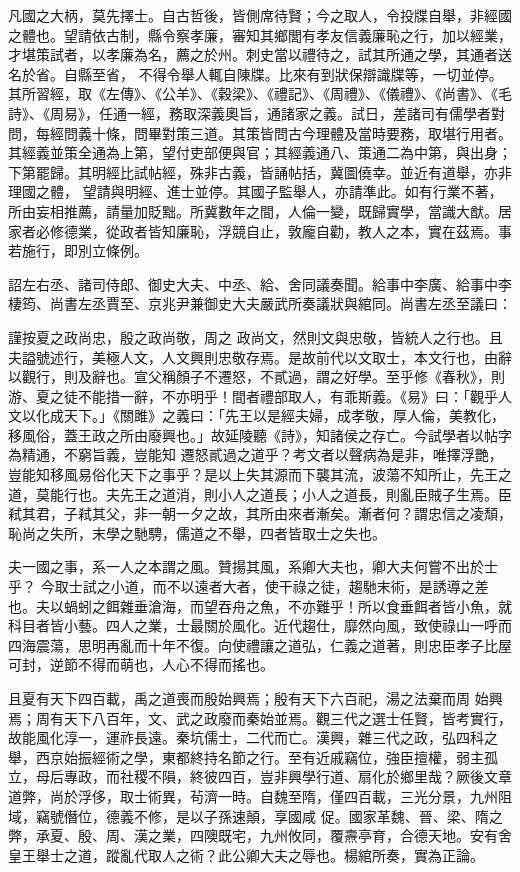 \begin{pinyinscope}
 凡國之大柄，莫先擇士。自古哲後，皆側席待賢；今之取人，令投牒自舉，非經國之體也。望請依古制，縣令察孝廉，審知其鄉閭有孝友信義廉恥之行，加以經業，才堪策試者，以孝廉為名，薦之於州。刺史當以禮待之，試其所通之學，其通者送名於省。自縣至省，
 不得令舉人輒自陳牒。比來有到狀保辯識牒等，一切並停。其所習經，取《左傳》、《公羊》、《穀梁》、《禮記》、《周禮》、《儀禮》、《尚書》、《毛詩》、《周易》，任通一經，務取深義奧旨，通諸家之義。試日，差諸司有儒學者對問，每經問義十條，問畢對策三道。其策皆問古今理體及當時要務，取堪行用者。其經義並策全通為上第，望付吏部便與官；其經義通八、策通二為中第，與出身；下第罷歸。其明經比試帖經，殊非古義，皆誦帖括，冀圖僥幸。並近有道舉，亦非理國之體，
 望請與明經、進士並停。其國子監舉人，亦請準此。如有行業不著，所由妄相推薦，請量加貶黜。所冀數年之間，人倫一變，既歸實學，當識大猷。居家者必修德業，從政者皆知廉恥，浮競自止，敦龐自勸，教人之本，實在茲焉。事若施行，即別立條例。



 詔左右丞、諸司侍郎、御史大夫、中丞、給、舍同議奏聞。給事中李廣、給事中李棲筠、尚書左丞賈至、京兆尹兼御史大夫嚴武所奏議狀與綰同。尚書左丞至議曰：



 謹按夏之政尚忠，殷之政尚敬，周之
 政尚文，然則文與忠敬，皆統人之行也。且夫謚號述行，美極人文，人文興則忠敬存焉。是故前代以文取士，本文行也，由辭以觀行，則及辭也。宣父稱顏子不遷怒，不貳過，謂之好學。至乎修《春秋》，則游、夏之徒不能措一辭，不亦明乎！間者禮部取人，有乖斯義。《易》曰：「觀乎人文以化成天下。」《關雎》之義曰：「先王以是經夫婦，成孝敬，厚人倫，美教化，移風俗，蓋王政之所由廢興也。」故延陵聽《詩》，知諸侯之存亡。今試學者以帖字為精通，不窮旨義，豈能知
 遷怒貳過之道乎？考文者以聲病為是非，唯擇浮艷，豈能知移風易俗化天下之事乎？是以上失其源而下襲其流，波蕩不知所止，先王之道，莫能行也。夫先王之道消，則小人之道長；小人之道長，則亂臣賊子生焉。臣弒其君，子弒其父，非一朝一夕之故，其所由來者漸矣。漸者何？謂忠信之凌頹，恥尚之失所，末學之馳騁，儒道之不舉，四者皆取士之失也。



 夫一國之事，系一人之本謂之風。贊揚其風，系卿大夫也，卿大夫何嘗不出於士乎？
 今取士試之小道，而不以遠者大者，使干祿之徒，趨馳末術，是誘導之差也。夫以蝸蚓之餌雜垂滄海，而望吞舟之魚，不亦難乎！所以食垂餌者皆小魚，就科目者皆小藝。四人之業，士最關於風化。近代趨仕，靡然向風，致使祿山一呼而四海震蕩，思明再亂而十年不復。向使禮讓之道弘，仁義之道著，則忠臣孝子比屋可封，逆節不得而萌也，人心不得而搖也。



 且夏有天下四百載，禹之道喪而殷始興焉；殷有天下六百祀，湯之法棄而周
 始興焉；周有天下八百年，文、武之政廢而秦始並焉。觀三代之選士任賢，皆考實行，故能風化淳一，運祚長遠。秦坑儒士，二代而亡。漢興，雜三代之政，弘四科之舉，西京始振經術之學，東都終持名節之行。至有近戚竊位，強臣擅權，弱主孤立，母后專政，而社稷不隕，終彼四百，豈非興學行道、扇化於鄉里哉？厥後文章道弊，尚於浮侈，取士術異，茍濟一時。自魏至隋，僅四百載，三光分景，九州阻域，竊號僭位，德義不修，是以子孫速顛，享國咸
 促。國家革魏、晉、梁、隋之弊，承夏、殷、周、漢之業，四隩既宅，九州攸同，覆燾亭育，合德天地。安有舍皇王舉士之道，蹤亂代取人之術？此公卿大夫之辱也。楊綰所奏，實為正論。




\end{pinyinscope}
